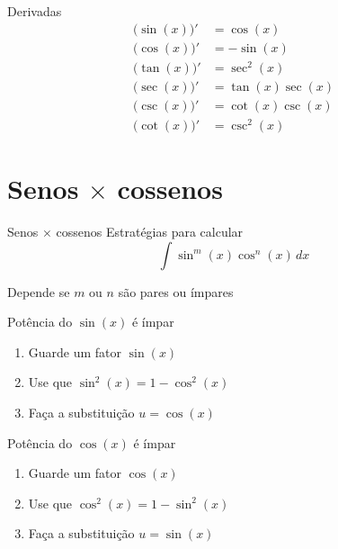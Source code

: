 \begin{frame}{Derivadas}
  \begin{align*}
    \big(\sin(x)\big)' & = \cos(x)        \\[2mm]
    \big(\cos(x)\big)' & = -\sin(x)       \\[2mm]
    \big(\tan(x)\big)' & = \sec^2(x)      \\[2mm]
    \big(\sec(x)\big)' & = \tan(x)\sec(x) \\[2mm]
    \big(\csc(x)\big)' & = \cot(x)\csc(x) \\[2mm]
    \big(\cot(x)\big)' & = \csc^2(x)
  \end{align*}

\end{frame}

\section{Senos $\times$ cossenos}

\begin{frame}{Senos $\times$ cossenos}
  Estratégias para calcular
  \[
    \int \sin^m(x) \cos^n(x)\,dx
  \]

  Depende se $m$ ou $n$ são pares ou ímpares
\end{frame}

\begin{frame}{Potência do $\sin(x)$ é ímpar}
  \begin{enumerate}[<+->]
    \setlength\itemsep{1em}
    \item Guarde um fator $\sin(x)$
    \item Use que $\sin^2(x) = 1 - \cos^2(x)$
    \item Faça a substituição $u=\cos(x)$
  \end{enumerate}
\end{frame}

\begin{frame}{Potência do $\cos(x)$ é ímpar}
  \begin{enumerate}[<+->]
    \setlength\itemsep{1em}
    \item Guarde um fator $\cos(x)$
    \item Use que $\cos^2(x) = 1 - \sin^2(x)$
    \item Faça a substituição $u=\sin(x)$
  \end{enumerate}
\end{frame}

